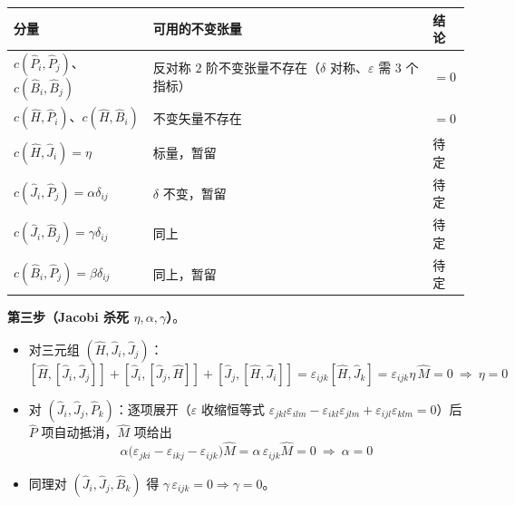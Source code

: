 \documentclass[
  chinese,
  a4paper,
  UTF8,
  12pt,
  oneside,
  openany]{ctexbook}
\newcounter{none} %
\providecommand{\tightlist}{%
  \setlength{\itemsep}{0pt}\setlength{\parskip}{0pt}}
\theoremstyle{plain}
\theoremstyle{plain}
\theoremstyle{plain}
\theoremstyle{definition}
\theoremstyle{plain}
\theoremstyle{plain}
\theoremstyle{remark}
\begin{document}
{\def\LTcaptype{none} %
\begin{longtable}[]{@{}
  >{\raggedright\arraybackslash}p{}
  >{\raggedright\arraybackslash}p{}
  >{\raggedright\arraybackslash}p{}@{}}
\toprule\noalign{}
\begin{minipage}[b]{\linewidth}\raggedright
分量
\end{minipage} & \begin{minipage}[b]{\linewidth}\raggedright
可用的不变张量
\end{minipage} & \begin{minipage}[b]{\linewidth}\raggedright
结论
\end{minipage} \\
\midrule\noalign{}
\endhead
\bottomrule\noalign{}
\endlastfoot
\(c(\hat P_i,\hat P_j)\)、\(c(\hat B_i,\hat B_j)\) & 反对称 \(2\)
阶不变张量不存在（\(\delta\) 对称、\(\varepsilon\) 需 \(3\) 个指标） &
\(=0\) \\
\(c(\hat H,\hat P_i)\)、\(c(\hat H,\hat B_i)\) & 不变矢量不存在 &
\(=0\) \\
\(c(\hat H,\hat J_i)=\eta\) & 标量，暂留 & 待定 \\
\(c(\hat J_i,\hat P_j)=\alpha\delta_{ij}\) & \(\delta\) 不变，暂留 &
待定 \\
\(c(\hat J_i,\hat B_j)=\gamma\delta_{ij}\) & 同上 & 待定 \\
\(c(\hat B_i,\hat P_j)=\beta\delta_{ij}\) & 同上，暂留 & 待定 \\
\end{longtable}
}

\textbf{第三步（Jacobi 杀死 \(\eta,\alpha,\gamma\)）}。

\begin{itemize}
\tightlist
\item
  对三元组 \((\hat H,\hat J_i,\hat J_j)\)： \[
  [\hat H,[\hat J_i,\hat J_j]]+[\hat J_i,[\hat J_j,\hat H]]+[\hat J_j,[\hat H,\hat J_i]]
  =\varepsilon_{ijk}[\hat H,\hat J_k]=\varepsilon_{ijk}\eta\,\hat M=0\ \Longrightarrow\ \eta=0
  \]
\item
  对 \((\hat J_i,\hat J_j,\hat P_k)\)：逐项展开（\(\varepsilon\)
  收缩恒等式
  \(\varepsilon_{jkl}\varepsilon_{ilm}-\varepsilon_{ikl}\varepsilon_{jlm}+\varepsilon_{ijl}\varepsilon_{klm}=0\)）后
  \(\hat P\) 项自动抵消，\(\hat M\) 项给出 \[
  \alpha\bigl(\varepsilon_{jki}-\varepsilon_{ikj}-\varepsilon_{ijk}\bigr)\hat M=\alpha\,\varepsilon_{ijk}\hat M=0\ \Longrightarrow\ \alpha=0
  \]
\item
  同理对 \((\hat J_i,\hat J_j,\hat B_k)\) 得
  \(\gamma\,\varepsilon_{ijk}=0\Longrightarrow\gamma=0\)。
\end{itemize}
\end{document}
